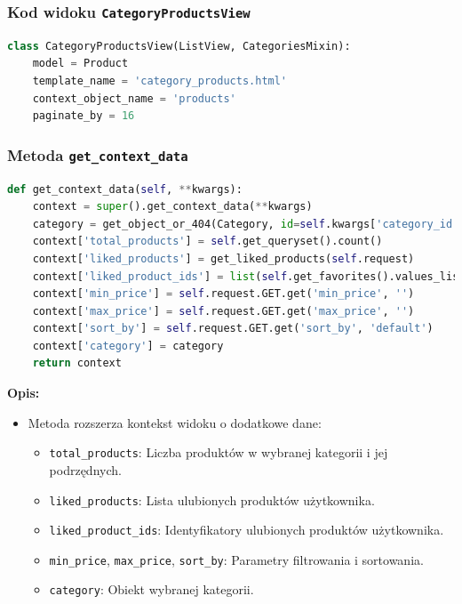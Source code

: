 \documentclass[12pt,a4paper,oneside]{article}
\theoremstyle{definition}
\numberwithin{equation}{section}
\begin{document}
\subsubsection*{Kod widoku \texttt{CategoryProductsView}}
\begin{lstlisting}[language=Python, caption=\texttt{CategoryProductsView}]
class CategoryProductsView(ListView, CategoriesMixin):
    model = Product
    template_name = 'category_products.html'
    context_object_name = 'products'
    paginate_by = 16
\end{lstlisting}

\subsubsection*{Metoda \texttt{get\_context\_data}}
\begin{lstlisting}[language=Python, caption=Metoda \texttt{get\_context\_data}]
def get_context_data(self, **kwargs):
    context = super().get_context_data(**kwargs)
    category = get_object_or_404(Category, id=self.kwargs['category_id'])
    context['total_products'] = self.get_queryset().count()
    context['liked_products'] = get_liked_products(self.request)
    context['liked_product_ids'] = list(self.get_favorites().values_list('id', flat=True))
    context['min_price'] = self.request.GET.get('min_price', '')
    context['max_price'] = self.request.GET.get('max_price', '')
    context['sort_by'] = self.request.GET.get('sort_by', 'default')
    context['category'] = category
    return context
\end{lstlisting}
\textbf{Opis:}
\begin{itemize}
    \item Metoda rozszerza kontekst widoku o dodatkowe dane:
    \begin{itemize}
        \item \texttt{total\_products}: Liczba produktów w wybranej kategorii i jej podrzędnych.
        \item \texttt{liked\_products}: Lista ulubionych produktów użytkownika.
        \item \texttt{liked\_product\_ids}: Identyfikatory ulubionych produktów użytkownika.
        \item \texttt{min\_price}, \texttt{max\_price}, \texttt{sort\_by}: Parametry filtrowania i sortowania.
        \item \texttt{category}: Obiekt wybranej kategorii.
    \end{itemize}
\end{itemize}
\end{document}
